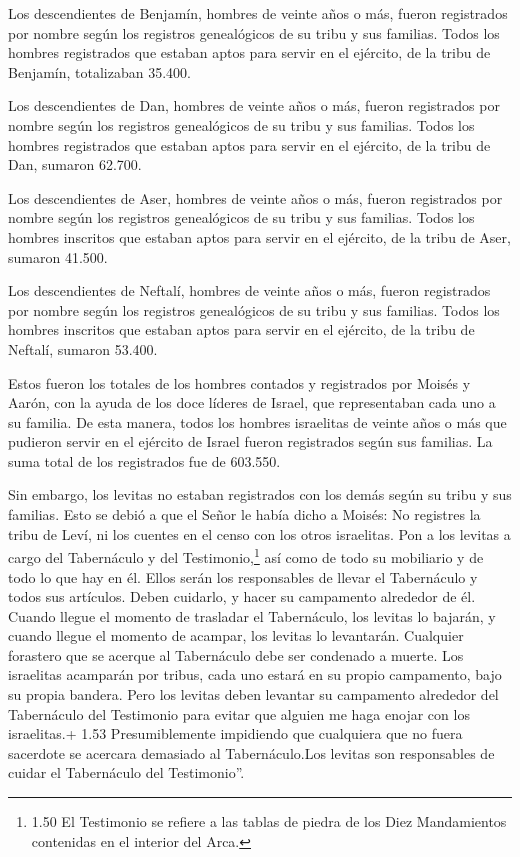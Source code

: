  Los descendientes de Benjamín, hombres de veinte años o
más, fueron registrados por nombre según los registros genealógicos de
su tribu y sus familias. Todos los hombres registrados que estaban aptos
para servir en el ejército,  de la tribu de Benjamín,
totalizaban 35.400.

 Los descendientes de Dan, hombres de veinte años o más,
fueron registrados por nombre según los registros genealógicos de su
tribu y sus familias. Todos los hombres registrados que estaban aptos
para servir en el ejército,  de la tribu de Dan, sumaron
62.700.

 Los descendientes de Aser, hombres de veinte años o más,
fueron registrados por nombre según los registros genealógicos de su
tribu y sus familias. Todos los hombres inscritos que estaban aptos para
servir en el ejército,  de la tribu de Aser, sumaron
41.500.

 Los descendientes de Neftalí, hombres de veinte años o
más, fueron registrados por nombre según los registros genealógicos de
su tribu y sus familias. Todos los hombres inscritos que estaban aptos
para servir en el ejército,  de la tribu de Neftalí,
sumaron 53.400.

 Estos fueron los totales de los hombres contados y
registrados por Moisés y Aarón, con la ayuda de los doce líderes de
Israel, que representaban cada uno a su familia.  De esta
manera, todos los hombres israelitas de veinte años o más que pudieron
servir en el ejército de Israel fueron registrados según sus familias.
 La suma total de los registrados fue de 603.550.

 Sin embargo, los levitas no estaban registrados con los
demás según su tribu y sus familias.  Esto se debió a que
el Señor le había dicho a Moisés:  No registres la tribu de
Leví, ni los cuentes en el censo con los otros israelitas. 
Pon a los levitas a cargo del Tabernáculo y del Testimonio,\footnote{1.50
  El Testimonio se refiere a las tablas de piedra de los Diez
  Mandamientos contenidas en el interior del Arca.} así como de todo su
mobiliario y de todo lo que hay en él. Ellos serán los responsables de
llevar el Tabernáculo y todos sus artículos. Deben cuidarlo, y hacer su
campamento alrededor de él.  Cuando llegue el momento de
trasladar el Tabernáculo, los levitas lo bajarán, y cuando llegue el
momento de acampar, los levitas lo levantarán. Cualquier forastero que
se acerque al Tabernáculo debe ser condenado a muerte.  Los
israelitas acamparán por tribus, cada uno estará en su propio
campamento, bajo su propia bandera.  Pero los levitas deben
levantar su campamento alrededor del Tabernáculo del Testimonio para
evitar que alguien me haga enojar con los israelitas.+ 1.53
Presumiblemente impidiendo que cualquiera que no fuera sacerdote se
acercara demasiado al Tabernáculo.Los levitas son responsables de cuidar
el Tabernáculo del Testimonio''.

